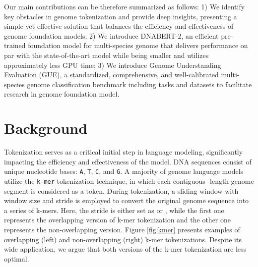 \documentclass{article}
\begin{document}
Our main contributions can be therefore summarized as follows: 1) We identify key obstacles in genome tokenization and provide deep insights, presenting a simple yet effective solution that balances the efficiency and effectiveness of genome foundation models;  2) We introduce DNABERT-2, an efficient pre-trained foundation model for multi-species genome that delivers performance on par with the state-of-the-art model while being  smaller and utilizes approximately  less GPU time; 3) We introduce Genome Understanding Evaluation (GUE), a standardized, comprehensive, and well-calibrated multi-species genome classification benchmark including  tasks and  datasets to facilitate research in genome foundation model.



\section{Background}
\label{sec:background}





\begin{figure*}[t]
		\centering
		\caption{Illustration of the drawbacks of k-mer tokenization. In the overlapping setting, information about a masked token is leaked by its adjacent tokens, while in the non-overlapping setting, adding/deleting one nucleotide base leads to a dramatic change in the tokenized sequence. }
		\label{fig:kmer}
\end{figure*}

Tokenization serves as a critical initial step in language modeling, significantly impacting the efficiency and effectiveness of the model. DNA sequences consist of  unique nucleotide bases: \texttt{A}, \texttt{T}, \texttt{C}, and \texttt{G}. A majority of genome language models \citep{dnabert, nt} utilize the \texttt{k-mer} tokenization technique, in which each contiguous -length genome segment is considered as a token. 
During tokenization, a sliding window with window size  and stride  is employed to convert the original genome sequence into a series of k-mers. Here, the stride  is either set as  or , while the first one represents the overlapping version of k-mer tokenization and the other one represents the non-overlapping version. 
Figure \ref{fig:kmer} presents examples of overlapping (left) and non-overlapping (right) k-mer tokenizations.
Despite its wide application, we argue that both versions of the k-mer tokenization are less optimal.
\end{document}
